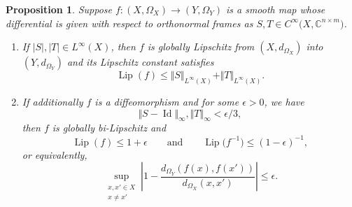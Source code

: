 \documentclass[10pt,a4paper]{amsart}
\numberwithin{equation}{section}
\newtheorem{Proposition}[Theorem]{Proposition}
\theoremstyle{definition}
\newcommand{\C}{\mathbb{C}} %
\newcommand{\1}{{\bf 1}}
\newcommand{\Id}{\operatorname{Id}}
\DeclareMathOperator{\Lip}{Lip}
\begin{document}
\begin{Proposition}\label{distancebound} Suppose $f\colon (X,\Omega_X)\rightarrow (Y,\Omega_Y)$ is a smooth map whose differential is given with respect to orthonormal frames as $S,T\in C^\infty\bigl(X,\C^{n\times m}\bigr)$.
\begin{enumerate}[label={\rm (\roman*)}]\itemsep=0pt
\item \label{lipschitz1} If $\vert S\vert,\vert T \vert \in L^\infty(X)$, then $f$ is globally Lipschitz from $(X,d_{\Omega_X})$ into $(Y,d_{\Omega_Y})$ and its Lipschitz constant satisfies
\begin{equation*}
\Lip(f) \le \Vert S \Vert_{L^\infty(X)}+ \Vert T \Vert_{L^\infty(X)}.
\end{equation*}
\item\label{lipschitz2} If additionally $f$ is a diffeomorphism and for some $\epsilon>0$, we have
\[
	\Vert S-\Id \Vert_\infty, \Vert T \Vert_\infty <\epsilon/3,
\]
 then $f$ is globally bi-Lipschitz and
 \begin{equation}\label{lipschitz3}
 \Lip (f) \le 1+ \epsilon \qquad \text{and} \qquad \Lip\bigl(f^{-1}\bigr) \le (1-\epsilon)^{-1},
 \end{equation}
 or equivalently,
 \begin{equation}
 \label{lipschitz4}
\sup_{\substack{x,x'\in X\\x\neq x'}}\left \vert 1 - \frac{d_{\Omega_Y}(f(x),f(x'))}{d_{\Omega_X}(x,x')} \right\vert \le \epsilon.
\end{equation}
\end{enumerate}
\end{Proposition}
\end{document}
